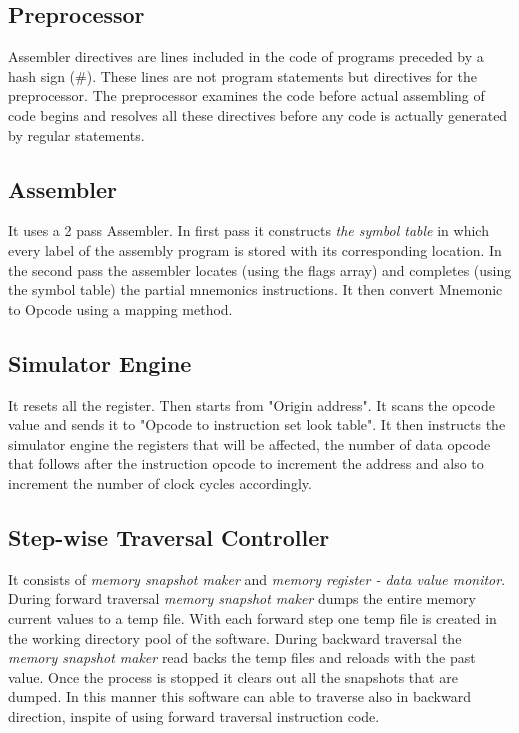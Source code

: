 \subsection{Preprocessor}
Assembler directives are lines included in the code of programs preceded by a hash sign (\#). These lines are not program statements but directives for the preprocessor. The preprocessor examines the code before actual assembling of code begins and resolves all these directives before any code is actually generated by regular statements. 

\subsection{Assembler}
It uses a 2 pass Assembler. In first pass it constructs \textit{the symbol table} in which every label of the assembly program is stored with its corresponding location. In the second pass the assembler locates (using the flags array) and completes (using the symbol table) the partial mnemonics instructions. It then convert Mnemonic to Opcode using a mapping method.

\subsection{Simulator Engine}
It resets all the register. Then starts from "Origin address". It scans the opcode value and sends it to "Opcode to instruction set look table". It then instructs the simulator engine the registers that will be affected, the number of data opcode that follows after the instruction opcode to increment the address and also to increment the number of clock cycles accordingly.

\subsection{Step-wise Traversal Controller}
It consists of \textit{memory snapshot maker} and \textit{memory register - data value monitor}. During forward traversal \textit{memory snapshot maker} dumps the entire memory current values to a temp file. With each forward step one temp file is created in the working directory pool of the software. During backward traversal the \textit{memory snapshot maker} read backs the temp files and reloads with the past value. Once the process is stopped it clears out all the snapshots that are dumped. In this manner this software can able to traverse also in backward direction, inspite of using forward traversal instruction code.


